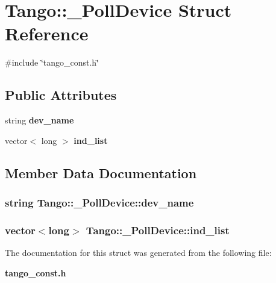 \section{Tango\-:\-:\-\_\-\-Poll\-Device Struct Reference}
\label{structTango_1_1__PollDevice}


{\ttfamily \#include \char`\"{}tango\-\_\-const.\-h\char`\"{}}

\subsection*{Public Attributes}
\begin{DoxyCompactItemize}
\item 
string {\bf dev\-\_\-name}
\item 
vector$<$ long $>$ {\bf ind\-\_\-list}
\end{DoxyCompactItemize}


\subsection{Member Data Documentation}
\subsubsection[{dev\-\_\-name}]{\setlength{\rightskip}{0pt plus 5cm}string Tango\-::\-\_\-\-Poll\-Device\-::dev\-\_\-name}\label{structTango_1_1__PollDevice_a4a2c9368c01e742c8f8b61d8eaa91038}
\subsubsection[{ind\-\_\-list}]{\setlength{\rightskip}{0pt plus 5cm}vector$<$long$>$ Tango\-::\-\_\-\-Poll\-Device\-::ind\-\_\-list}\label{structTango_1_1__PollDevice_af1307f5618ec885d6ae0cabb1bf82769}


The documentation for this struct was generated from the following file\-:\begin{DoxyCompactItemize}
\item 
{\bf tango\-\_\-const.\-h}\end{DoxyCompactItemize}
